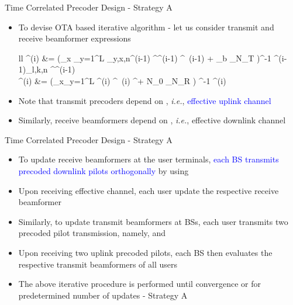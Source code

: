 \documentclass[9pt]{beamer}
\begin{document}
\begin{frame}{Time Correlated Precoder Design - Strategy A}
	\begin{itemize}
		\item To devise \ac{OTA} based iterative algorithm - let us consider transmit and receive beamformer expressions
		\begin{IEEEeqnarray*}{ll}
		^{(i)} &= \Big (\displaystyle \sum_{x \in {}} \sum_{y=1}^L \alpha_{y,x,n}^{(i-1)} ^\herm {}^{(i-1)} ^{\herm \, {(i-1)}}  + \delta_b _{N_T} \Big )^{-1} \alpha^{(i-1)}_{l,k,n} ^\herm {}^{(i-1)}  \\
		^{(i)} &= \Big (\displaystyle \sum_{x\in{}}\sum_{y=1}^L  ^{(i)} ^{\herm \, (i)} ^\herm + N_0 _{N_R} \Big ) ^{-1} \;  \; ^{(i)}
		\end{IEEEeqnarray*}
		\item Note that transmit precoders  depend on , \textit{i.e.}, \textcolor{blue}{effective uplink channel}
		\item Similarly, receive beamformers  depend on , \textit{i.e.}, \textcolor[rgb]{0,0.6,0}{effective downlink channel}
	\end{itemize}	
\end{frame}

\begin{frame}{Time Correlated Precoder Design - Strategy A}
	\begin{itemize}
		\item To update receive beamformers at the user terminals, \textcolor{blue}{each \ac{BS} transmits precoded downlink pilots orthogonally} by using 
		\item Upon receiving effective channel, each user update the respective receive beamformer
		\item Similarly, to update transmit beamformers at \acp{BS}, \textcolor[rgb]{0,0.6,0}{each user transmits two precoded pilot transmission}, namely,  and 
		\item Upon receiving two uplink precoded pilots, each \ac{BS} then evaluates the respective transmit beamformers of all users
		\item The above iterative procedure is performed until convergence or for predetermined number of updates - \alert{Strategy A}
	\end{itemize}	
\end{frame}
\end{document}
